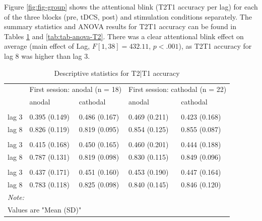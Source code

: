 \documentclass[11pt,]{memoir}
\begin{document}
Figure \ref{fig:fig-group} shows the attentional blink (T2\textbar{}T1 accuracy per lag) for each of the three blocks (pre, tDCS, post) and stimulation conditions separately. The summary statistics and ANOVA results for T2\textbar{}T1 accuracy can be found in Tables \ref{tab:tab-descriptives-T2} and \ref{tab:tab-anova-T2}. There was a clear attentional blink effect on average (main effect of Lag, \(F[1, 38] = 432.11\), \(p < .001\)), as T2\textbar{}T1 accuracy for lag 8 was higher than lag 3.

\small

\begin{table}[t]

\caption{\label{tab:tab-descriptives-T2}Descriptive statistics for T2|T1 accuracy}
\centering
\fontsize{11}{13}\selectfont
\begin{tabular}{lllll}
\toprule
\multicolumn{1}{c}{ } & \multicolumn{2}{c}{First session: anodal (n = 18)} & \multicolumn{2}{c}{First session: cathodal (n = 22)} \\
\cmidrule(l{3pt}r{3pt}){2-3} \cmidrule(l{3pt}r{3pt}){4-5}
 & anodal & cathodal & anodal & cathodal\\
\midrule
\addlinespace[0.3em]
\multicolumn{5}{l}{\textbf{baseline}}\\
\hspace{1em}lag 3 & 0.395 (0.149) & 0.486 (0.167) & 0.469 (0.211) & 0.423 (0.168)\\
\hspace{1em}lag 8 & 0.826 (0.119) & 0.819 (0.095) & 0.854 (0.125) & 0.855 (0.087)\\
\addlinespace[0.3em]
\multicolumn{5}{l}{\textbf{tDCS}}\\
\hspace{1em}lag 3 & 0.415 (0.168) & 0.450 (0.165) & 0.460 (0.201) & 0.444 (0.188)\\
\hspace{1em}lag 8 & 0.787 (0.131) & 0.819 (0.098) & 0.830 (0.115) & 0.849 (0.096)\\
\addlinespace[0.3em]
\multicolumn{5}{l}{\textbf{post}}\\
\hspace{1em}lag 3 & 0.437 (0.171) & 0.451 (0.160) & 0.453 (0.190) & 0.447 (0.164)\\
\hspace{1em}lag 8 & 0.783 (0.118) & 0.825 (0.098) & 0.840 (0.145) & 0.846 (0.120)\\
\bottomrule
\multicolumn{5}{l}{\textit{Note: }}\\
\multicolumn{5}{l}{Values are "Mean (SD)"}\\
\end{tabular}
\end{table}
\end{document}
